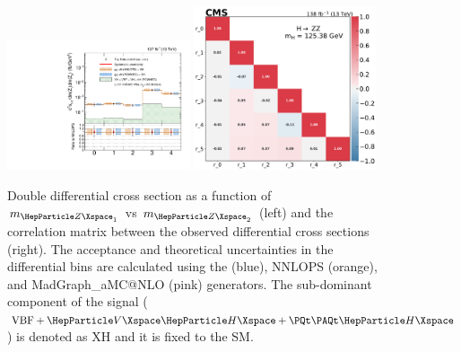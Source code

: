 \begin{center}
	\begin{figure}[!htb]
		\centering
		\includegraphics[width=0.48\textwidth]{Images/H4L/doublediff/massZ1_massZ2_unfoldwith_SM_125_logscale_asimov.pdf}
		\includegraphics[width=0.48\textwidth]{Images/H4L/correlations/corr_massZ1_massZ2_v3.pdf}\\
		\caption{
			Double differential cross section as a function of $m_{\PZ_{1}}$ vs $m_{\PZ_{2}}$ (left) and the correlation matrix between the observed differential cross sections (right).
			The acceptance and theoretical uncertainties in the differential bins are calculated using the \POWHEG (blue), NNLOPS (orange), and MadGraph\_aMC@NLO (pink) generators.
			The sub-dominant component of the signal ($\VBF + \VH + \ttH$) is denoted as XH and it is fixed to the SM.
			\label{fig:fidMZ1MZ2}}
	\end{figure}
\end{center}

\clearpage

